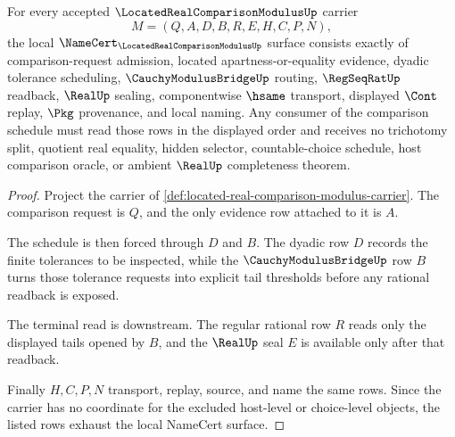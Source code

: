 \begin{theorem}
\label{thm:located-real-comparison-modulus-obligations}
For every accepted $\LocatedRealComparisonModulusUp$ carrier
$$
M=(Q,A,D,B,R,E,H,C,P,N),
$$
the local $\NameCert_{\LocatedRealComparisonModulusUp}$ surface consists exactly of comparison-request admission, located apartness-or-equality evidence, dyadic tolerance scheduling, $\CauchyModulusBridgeUp$ routing, $\RegSeqRatUp$ readback, $\RealUp$ sealing, componentwise $\hsame$ transport, displayed $\Cont$ replay, $\Pkg$ provenance, and local naming. Any consumer of the comparison schedule must read those rows in the displayed order and receives no trichotomy split, quotient real equality, hidden selector, countable-choice schedule, host comparison oracle, or ambient $\RealUp$ completeness theorem.
\end{theorem}
\begin{proof}
Project the carrier of \autoref{def:located-real-comparison-modulus-carrier}. The comparison request is $Q$, and the only evidence row attached to it is $A$.

The schedule is then forced through $D$ and $B$. The dyadic row $D$ records the finite tolerances to be inspected, while the $\CauchyModulusBridgeUp$ row $B$ turns those tolerance requests into explicit tail thresholds before any rational readback is exposed.

The terminal read is downstream. The regular rational row $R$ reads only the displayed tails opened by $B$, and the $\RealUp$ seal $E$ is available only after that readback.

Finally $H,C,P,N$ transport, replay, source, and name the same rows. Since the carrier has no coordinate for the excluded host-level or choice-level objects, the listed rows exhaust the local NameCert surface.
\end{proof}


